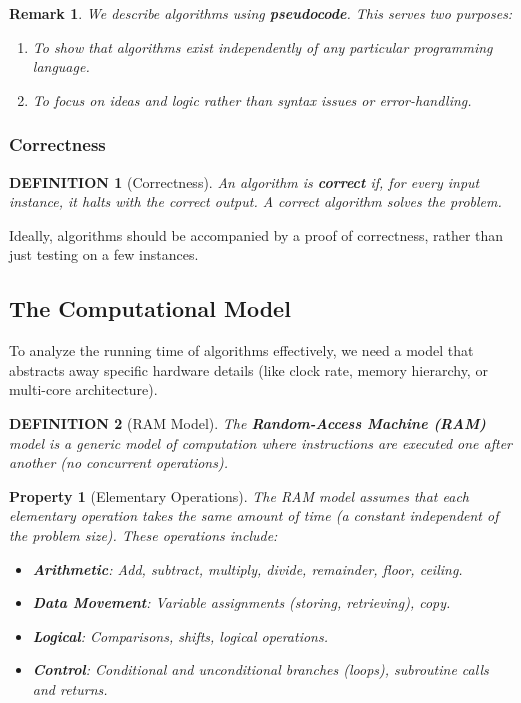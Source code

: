 \documentclass[12pt]{article}
\theoremstyle{blueplain}
\newtheorem{property}[theorem]{Property}
\theoremstyle{bluedef}
\newtheorem{definition}{DEFINITION}[section]
\theoremstyle{blueremark}
\newtheorem{remark}{Remark}[section]
\begin{document}
\begin{remark}
    We describe algorithms using \textbf{pseudocode}. This serves two purposes:
    \begin{enumerate}
        \item To show that algorithms exist independently of any particular programming language.
        \item To focus on ideas and logic rather than syntax issues or error-handling.
    \end{enumerate}
\end{remark}

\subsubsection{Correctness}

\begin{definition}[Correctness]
    An algorithm is \textbf{correct} if, for every input instance, it halts with the correct output. A correct algorithm solves the problem.
\end{definition}

\noindent Ideally, algorithms should be accompanied by a proof of correctness, rather than just testing on a few instances.

\subsection{The Computational Model}

To analyze the running time of algorithms effectively, we need a model that abstracts away specific hardware details (like clock rate, memory hierarchy, or multi-core architecture).

\begin{definition}[RAM Model]
    The \textbf{Random-Access Machine (RAM)} model is a generic model of computation where instructions are executed one after another (no concurrent operations).
\end{definition}

\begin{property}[Elementary Operations]
    The RAM model assumes that each elementary operation takes the same amount of time (a constant independent of the problem size). These operations include:
    \begin{itemize}
        \item \textbf{Arithmetic}: Add, subtract, multiply, divide, remainder, floor, ceiling.
        \item \textbf{Data Movement}: Variable assignments (storing, retrieving), copy.
        \item \textbf{Logical}: Comparisons, shifts, logical operations.
        \item \textbf{Control}: Conditional and unconditional branches (loops), subroutine calls and returns.
    \end{itemize}
\end{property}
\end{document}
